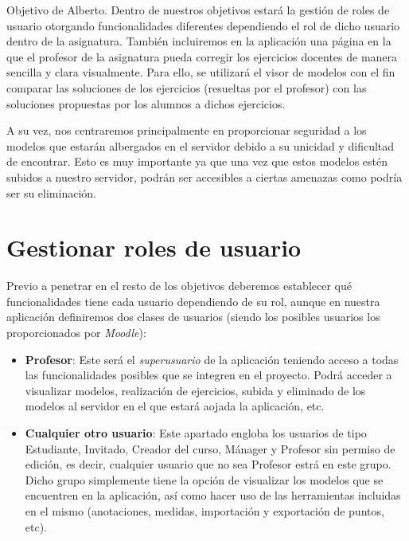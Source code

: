 
Objetivo de Alberto.
Dentro de nuestros objetivos estará la gestión de roles de usuario otorgando funcionalidades diferentes dependiendo el rol de dicho usuario dentro de la asignatura. También incluiremos en la aplicación una página en la que el profesor de la asignatura pueda corregir los ejercicios docentes de manera sencilla y clara visualmente. Para ello, se utilizará el visor de modelos con el fin comparar las soluciones de los ejercicios (resueltas por el profesor) con las soluciones propuestas por los alumnos a dichos ejercicios.

A su vez, nos centraremos principalmente en proporcionar seguridad a los modelos que estarán albergados en el servidor debido a su unicidad y dificultad de encontrar. Esto es muy importante ya que una vez que estos modelos estén subidos a nuestro servidor, podrán ser accesibles a ciertas amenazas como podría ser su eliminación.

\section{Gestionar roles de usuario}
Previo a penetrar en el resto de los objetivos deberemos establecer qué funcionalidades tiene cada usuario dependiendo de su rol, aunque en nuestra aplicación definiremos dos clases de usuarios (siendo los posibles usuarios los proporcionados por \textit{Moodle}):

\begin{itemize}
	\item \textbf{Profesor}: Este será el \textit{superusuario} de la aplicación teniendo acceso a todas las funcionalidades posibles que se integren en el proyecto. Podrá acceder a visualizar modelos, realización de ejercicios, subida y eliminado de los modelos al servidor en el que estará aojada la aplicación, etc.
	
	\item \textbf{Cualquier otro usuario}: Este apartado engloba los usuarios de tipo Estudiante, Invitado, Creador del curso, Mánager y Profesor sin permiso de edición, es decir, cualquier usuario que no sea Profesor estrá en este grupo. Dicho grupo simplemente tiene la opción de visualizar los modelos que se encuentren en la aplicación, así como hacer uso de las herramientas incluidas en el mismo (anotaciones, medidas, importación y exportación de puntos, etc).
\end{itemize}

